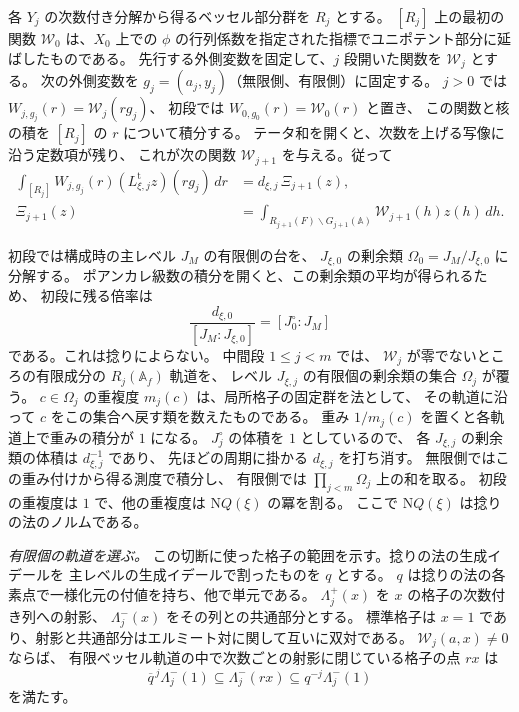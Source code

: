 各 \(Y_j\) の次数付き分解から得るベッセル部分群を \(R_j\) とする。
\([R_j]\) 上の最初の関数 \(\mathcal W_0\) は、\(X_0\) 上での
\(\phi\) の行列係数を指定された指標でユニポテント部分に延ばしたものである。
先行する外側変数を固定して、\(j\) 段開いた関数を \(\mathcal W_j\) とする。
次の外側変数を \(g_j=(a_j,y_j)\)（無限側、有限側）に固定する。
\(j>0\) では \(W_{j,g_j}(r)=\mathcal W_j(rg_j)\)、
初段では \(W_{0,g_0}(r)=\mathcal W_0(r)\) と置き、
この関数と核の積を \([R_j]\) の \(r\) について積分する。
テータ和を開くと、次数を上げる写像に沿う定数項が残り、
これが次の関数 \(\mathcal W_{j+1}\) を与える。従って
\[
 \begin{aligned}
 \int_{[R_j]}W_{j,g_j}(r)(L_{\xi,j}^{\mathrm t}z)(rg_j)\,dr
   &=d_{\xi,j}\,\Xi_{j+1}(z),\\
 \Xi_{j+1}(z)
   &=\int_{R_{j+1}(F)\backslash G_{j+1}(\mathbb A)}
                   \mathcal W_{j+1}(h)z(h)\,dh .
 \end{aligned}
\]

初段では構成時の主レベル \(J_M\) の有限側の台を、
\(J_{\xi,0}\) の剰余類 \(\Omega_0=J_M/J_{\xi,0}\) に分解する。
ポアンカレ級数の積分を開くと、この剰余類の平均が得られるため、
初段に残る倍率は
\[
 \frac{d_{\xi,0}}{[J_M:J_{\xi,0}]}=[J^\circ_0:J_M]
\]
である。これは捻りによらない。
中間段 \(1\le j<m\) では、
\(\mathcal W_j\) が零でないところの有限成分の \(R_j(\mathbb A_f)\) 軌道を、
レベル \(J_{\xi,j}\) の有限個の剰余類の集合 \(\Omega_j\) が覆う。
\(c\in\Omega_j\) の重複度 \(m_j(c)\) は、局所格子の固定群を法として、
その軌道に沿って \(c\) をこの集合へ戻す類を数えたものである。
重み \(1/m_j(c)\) を置くと各軌道上で重みの積分が \(1\) になる。
\(J^\circ_j\) の体積を \(1\) としているので、
各 \(J_{\xi,j}\) の剰余類の体積は \(d_{\xi,j}^{-1}\) であり、
先ほどの周期に掛かる \(d_{\xi,j}\) を打ち消す。
無限側ではこの重み付けから得る測度で積分し、
有限側では \(\prod_{j<m}\Omega_j\) 上の和を取る。
初段の重複度は \(1\) で、他の重複度は
\(\mathrm NQ(\xi)\) の冪を割る。
ここで \(\mathrm NQ(\xi)\) は捻りの法のノルムである。

\emph{有限個の軌道を選ぶ。}
この切断に使った格子の範囲を示す。捻りの法の生成イデールを
主レベルの生成イデールで割ったものを \(q\) とする。
\(q\) は捻りの法の各素点で一様化元の付値を持ち、他で単元である。
\(\Lambda_j^+(x)\) を \(x\) の格子の次数付き列への射影、
\(\Lambda_j^-(x)\) をその列との共通部分とする。
標準格子は \(x=1\) であり、射影と共通部分はエルミート対に関して互いに双対である。
\(\mathcal W_j(a,x)\ne0\) ならば、
有限ベッセル軌道の中で次数ごとの射影に閉じている格子の点 \(r x\) は
\begin{equation}\label{eq:upper-cut-lattices}
  \overline q^{\,j}\Lambda_j^-(1)\subseteq\Lambda_j^-(r x)
             \subseteq q^{-j}\Lambda_j^-(1)
\end{equation}
を満たす。

